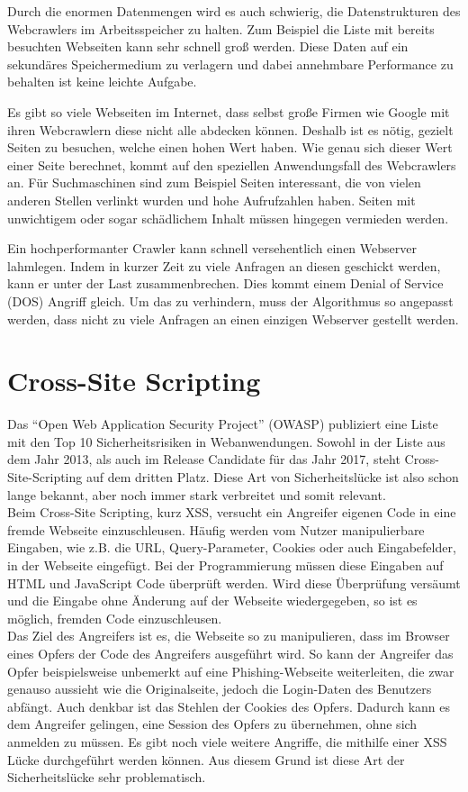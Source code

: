 Durch die enormen Datenmengen wird es auch schwierig, die Datenstrukturen des Webcrawlers im Arbeitsspeicher zu halten. Zum Beispiel die Liste mit bereits besuchten Webseiten kann sehr schnell groß werden. Diese Daten auf ein sekundäres Speichermedium zu verlagern und dabei annehmbare Performance zu behalten ist keine leichte Aufgabe. 

Es gibt so viele Webseiten im Internet, dass selbst große Firmen wie Google mit ihren Webcrawlern diese nicht alle abdecken können. Deshalb ist es nötig, gezielt Seiten zu besuchen, welche einen hohen Wert haben. Wie genau sich dieser Wert einer Seite berechnet, kommt auf den speziellen Anwendungsfall des Webcrawlers an. Für Suchmaschinen sind zum Beispiel Seiten interessant, die von vielen anderen Stellen verlinkt wurden und hohe Aufrufzahlen haben. Seiten mit unwichtigem oder sogar schädlichem Inhalt müssen hingegen vermieden werden. 

Ein hochperformanter Crawler kann schnell versehentlich einen Webserver lahmlegen. Indem in kurzer Zeit zu viele Anfragen an diesen geschickt werden, kann er unter der Last zusammenbrechen. Dies kommt einem Denial of Service (DOS) Angriff gleich. Um das zu verhindern, muss der Algorithmus so angepasst werden, dass nicht zu viele Anfragen an einen einzigen Webserver gestellt werden.

\section{Cross-Site Scripting}
Das \enquote{Open Web Application Security Project} (OWASP) publiziert eine Liste mit den Top 10 Sicherheitsrisiken in Webanwendungen.\cite{OWASPTop10} Sowohl in der Liste aus dem Jahr 2013, als auch im Release Candidate für das Jahr 2017, steht Cross-Site-Scripting auf dem dritten Platz. Diese Art von Sicherheitslücke ist also schon lange bekannt, aber noch immer stark verbreitet und somit relevant. \\
Beim Cross-Site Scripting, kurz XSS, versucht ein Angreifer eigenen Code in eine fremde Webseite einzuschleusen. Häufig werden vom Nutzer manipulierbare Eingaben, wie z.B. die URL, Query-Parameter, Cookies oder auch Eingabefelder, in der Webseite eingefügt. Bei der Programmierung müssen diese Eingaben auf HTML und JavaScript Code überprüft werden. Wird diese Überprüfung versäumt und die Eingabe ohne Änderung auf der Webseite wiedergegeben, so ist es möglich, fremden Code einzuschleusen. \cite{XSSErklaerung} \\
Das Ziel des Angreifers ist es, die Webseite so zu manipulieren, dass im Browser eines Opfers der Code des Angreifers ausgeführt wird. So kann der Angreifer das Opfer beispielsweise unbemerkt auf eine Phishing-Webseite weiterleiten, die zwar genauso aussieht wie die Originalseite, jedoch die Login-Daten des Benutzers abfängt. Auch denkbar ist das Stehlen der Cookies des Opfers. Dadurch kann es dem Angreifer gelingen, eine Session des Opfers zu übernehmen, ohne sich anmelden zu müssen. \cite{SessionHijacking} Es gibt noch viele weitere Angriffe, die mithilfe einer XSS Lücke durchgeführt werden können. Aus diesem Grund ist diese Art der Sicherheitslücke sehr problematisch.
